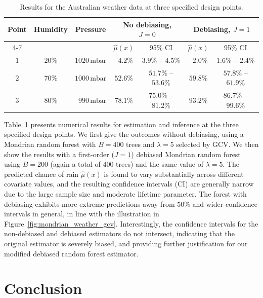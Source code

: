 \documentclass[11pt,lof]{puthesis}
\theoremstyle{break}
\theoremstyle{proof}
\begin{document}
\begin{table}[t]
  \centering
  \begin{tabular}{|c|c|c|c|c|c|c|}
    \hline
    \multirow{2}{*}{Point}
    & \multirow{2}{*}{Humidity}
    & \multirow{2}{*}{Pressure}
    & \multicolumn{2}{|c|}{No debiasing, $J=0$}
    & \multicolumn{2}{|c|}{Debiasing, $J=1$} \\
    \cline{4-7}
    & &
    & $\hat\mu(x)$ & 95\% CI
    & $\hat\mu(x)$ & 95\% CI \\
    \hline
    $1$ & $20\%$ & $1020\,\textrm{mbar}$ &
    $\phantom{0}4.2\%$ &
    $3.9\%$ -- $4.5\%$ &
    $\phantom{0}2.0\%$ &
    $1.6\%$ -- $2.4\%$ \\
    $2$ & $70\%$ & $1000\,\textrm{mbar}$ &
    $52.6\%$ &
    $51.7\%$ -- $53.6\%$ &
    $59.8\%$ &
    $57.8\%$ -- $61.9\%$ \\
    $3$ & $80\%$ & $\phantom{1}990\,\textrm{mbar}$ &
    $78.1\%$ &
    $75.0\%$ -- $81.2\%$ &
    $93.2\%$ &
    $86.7\%$ -- $99.6\%$ \\
    \hline
  \end{tabular}
  \caption[Results for the Australian weather data]{
    Results for the Australian weather data
  at three specified design points.}
  \label{tab:mondrian_weather_ci}
\end{table}

Table~\ref{tab:mondrian_weather_ci} presents numerical results for estimation
and
inference at the three specified design points. We first give the outcomes
without debiasing, using a Mondrian random forest with $B = 400$ trees and
$\lambda = 5$ selected by GCV. We then show the results with a first-order
($J=1$) debiased Mondrian random forest using $B = 200$ (again a total of
$400$ trees) and the same value of $\lambda = 5$. The predicted chance of rain
$\hat\mu(x)$ is found to vary substantially across different covariate values,
and the resulting confidence intervals (CI) are generally narrow due to the
large sample size and moderate lifetime parameter. The forest with debiasing
exhibits more extreme predictions away from $50\%$ and wider confidence
intervals in general, in line with the illustration in
Figure~\ref{fig:mondrian_weather_gcv}. Interestingly, the confidence intervals
for the
non-debiased and debiased estimators do not intersect, indicating that the
original estimator is severely biased, and providing further justification for
our modified debiased random forest estimator.

\section{Conclusion}%
\label{sec:mondrian_conclusion}
\end{document}
